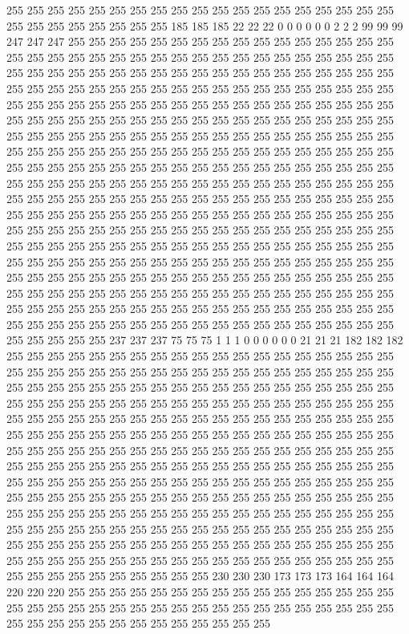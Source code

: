 255 255 255 255 255 255 255 255 255 255 255 255 255 255 255 255 255 255 255 255 255 255 255 255 255 255 255 185 185 185 22 22 22 0 0 0 0 0 0 2 2 2 99 99 99 247 247 247 255 255 255 255 255 255 255 255 255 255 255 255 255 255 255 255 255 255 255 255 255 255 255 255 255 255 255 255 255 255 255 255 255 255 255 255 255 255 255 255 255 255 255 255 255 255 255 255 255 255 255 255 255 255 255 255 255 255 255 255 255 255 255 255 255 255 255 255 255 255 255 255 255 255 255 255 255 255 255 255 
255 255 255 255 255 255 255 255 255 255 255 255 255 255 255 255 255 255 255 255 255 255 255 255 255 255 255 255 255 255 255 255 255 255 255 255 255 255 255 255 255 255 255 255 255 255 255 255 255 255 255 255 255 255 255 255 255 255 255 255 255 255 255 255 255 255 255 255 255 255 255 255 255 255 255 255 255 255 255 255 255 255 255 255 255 255 255 255 255 255 255 255 255 255 255 255 255 255 255 255 255 255 255 255 255 255 255 255 255 255 255 255 255 255 255 255 255 255 255 255 255 255 255 255 255 255 255 255 
255 255 255 255 255 255 255 255 255 255 255 255 255 255 255 255 255 255 255 255 255 255 255 255 255 255 255 255 255 255 255 255 255 255 255 255 255 255 255 255 255 255 255 255 255 255 255 255 255 255 255 255 255 255 255 255 255 255 255 255 255 255 255 255 255 255 255 255 255 255 255 255 255 255 255 255 255 255 255 255 255 255 255 255 255 255 255 255 255 255 255 255 255 255 255 255 255 255 255 255 255 255 255 255 255 255 255 255 255 255 255 255 255 255 255 255 255 255 255 255 255 255 255 255 255 255 255 255 
255 255 255 255 255 255 255 255 255 255 255 255 255 255 255 255 255 255 255 255 255 255 255 255 255 255 255 237 237 237 75 75 75 1 1 1 0 0 0 0 0 0 21 21 21 182 182 182 255 255 255 255 255 255 255 255 255 255 255 255 255 255 255 255 255 255 255 255 255 255 255 255 255 255 255 255 255 255 255 255 255 255 255 255 255 255 255 255 255 255 255 255 255 255 255 255 255 255 255 255 255 255 255 255 255 255 255 255 255 255 255 255 255 255 255 255 255 255 255 255 255 255 255 255 255 255 255 255 
255 255 255 255 255 255 255 255 255 255 255 255 255 255 255 255 255 255 255 255 255 255 255 255 255 255 255 255 255 255 255 255 255 255 255 255 255 255 255 255 255 255 255 255 255 255 255 255 255 255 255 255 255 255 255 255 255 255 255 255 255 255 255 255 255 255 255 255 255 255 255 255 255 255 255 255 255 255 255 255 255 255 255 255 255 255 255 255 255 255 255 255 255 255 255 255 255 255 255 255 255 255 255 255 255 255 255 255 255 255 255 255 255 255 255 255 255 255 255 255 255 255 255 255 255 255 255 255 
255 255 255 255 255 255 255 255 255 255 255 255 255 255 255 255 255 255 255 255 255 255 255 255 255 255 255 255 255 255 255 255 255 255 255 255 255 255 255 255 255 255 255 255 255 255 255 255 255 255 255 255 255 255 255 255 255 255 255 255 255 255 255 255 255 255 255 255 230 230 230 173 173 173 164 164 164 220 220 220 255 255 255 255 255 255 255 255 255 255 255 255 255 255 255 255 255 255 255 255 255 255 255 255 255 255 255 255 255 255 255 255 255 255 255 255 255 255 255 255 255 255 255 255 255 255 255 255 
